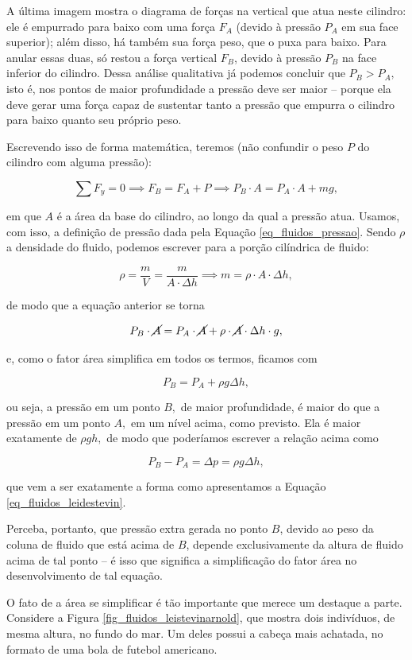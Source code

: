 A última imagem mostra o diagrama de forças na vertical que atua neste cilindro: ele é empurrado para baixo com uma força $F_A$ (devido à pressão $P_A$ em sua face superior); além disso, há também sua força peso, que o puxa para baixo. Para anular essas duas, só restou a força vertical $F_B$, devido à pressão $P_B$ na face inferior do cilindro. Dessa análise qualitativa já podemos concluir que $P_B > P_A,$ isto é, nos pontos de maior profundidade a pressão deve ser maior -- porque ela deve gerar uma força capaz de sustentar tanto a pressão que empurra o cilindro para baixo quanto seu próprio peso.

Escrevendo isso de forma matemática, teremos (não confundir o peso $P$ do cilindro com alguma pressão):

$$ \sum F_y = 0 \implies F_B = F_A + P \implies P_B \cdot A = P_A \cdot A + mg, $$

\noindent em que $A$ é a área da base do cilindro, ao longo da qual a pressão atua. Usamos, com isso, a definição de pressão dada pela Equação \eqref{eq_fluidos_pressao}. Sendo $\rho$ a densidade do fluido, podemos escrever para a porção cilíndrica de fluido:

$$ \rho = \dfrac{m}{V} = \dfrac{m}{A\cdot \Delta h} \implies m = \rho \cdot A \cdot \Delta h,$$

\noindent de modo que a equação anterior se torna

$$ P_B \cdot \cancel A = P_A \cdot \cancel A+  \rho \cdot \cancel A \cdot \Delta  h \cdot g,$$

\noindent e, como o fator área simplifica em todos os termos, ficamos com 

$$ P_B = P_A + \rho g \Delta h,$$

\noindent ou seja, a pressão em um ponto $B,$ de maior profundidade, é maior do que a pressão em um ponto $A,$ em um nível acima, como previsto. Ela é maior exatamente de $\rho g h,$ de modo que poderíamos escrever a relação acima como

$$ P_B - P_A = \Delta p = \rho g \Delta h,$$

\noindent que vem a ser exatamente a forma como apresentamos a Equação \eqref{eq_fluidos_leidestevin}. 

Perceba, portanto, que pressão extra gerada no ponto $B$, devido ao peso da coluna de fluido que está acima de $B$, depende exclusivamente da altura de fluido acima de tal ponto -- é isso que significa a simplificação do fator área no desenvolvimento de tal equação.

O fato de a área se simplificar é tão importante que merece um destaque a parte. Considere a Figura \ref{fig_fluidos_leistevinarnold}, que mostra dois indivíduos, de mesma altura, no fundo do mar. Um deles possui a cabeça mais achatada, no formato de uma bola de futebol americano. 


